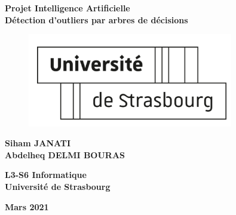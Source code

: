 
\begin{center}
\linespread{2}\huge\textbf{Projet Intelligence Artificielle\\} 
\large\textbf{Détection d’outliers par arbres de décisions}
\vspace{1.2in}
\end{center}

\begin{figure}[h]
    \centering
    \includegraphics[width=0.8\textwidth]{logo-unistra.png}
\end{figure}

\begin{center}
\vspace{1.2in}\huge
\textbf{Siham JANATI \\
Abdelheq DELMI BOURAS }
\vspace{1.2in}

\large\textbf{L3-S6 Informatique \\ Université de Strasbourg}
\vspace{1.2in}

\textbf{Mars 2021}
\end{center}